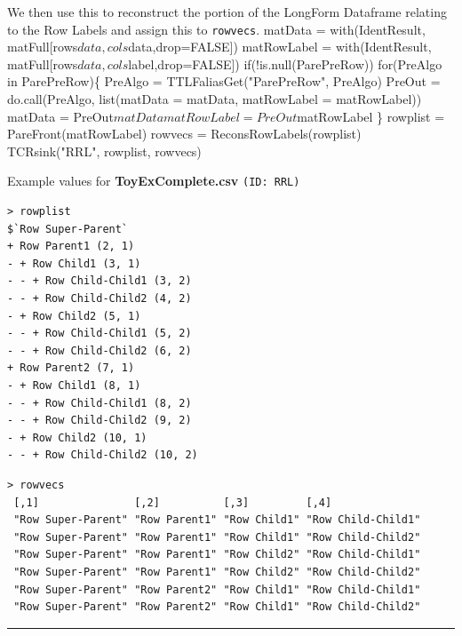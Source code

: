 \documentclass[a4paper]{article}
\begin{document}
We then use this to reconstruct the portion of the LongForm Dataframe
relating to the Row Labels and assign this to \verb|rowvecs|.
\nwenddocs{}\endmoddef
matData = with(IdentResult,
  matFull[rows$data, cols$data,drop=FALSE])
matRowLabel = with(IdentResult,
  matFull[rows$data, cols$label,drop=FALSE])
if(!is.null(ParePreRow))
  for(PreAlgo in ParePreRow)\{
    PreAlgo = TTLFaliasGet("ParePreRow", PreAlgo)
    PreOut = do.call(PreAlgo,
      list(matData = matData, matRowLabel = matRowLabel))
    matData = PreOut$matData
    matRowLabel = PreOut$matRowLabel
  \}
rowplist = PareFront(matRowLabel)
rowvecs = ReconsRowLabels(rowplist)
TCRsink("RRL", rowplist, rowvecs)
\eatline
{}\nwendcode{}\nwdocspar

Example values for \textbf{ToyExComplete.csv} \texttt{(ID: RRL)}
\begin{verbatim}
> rowplist
$`Row Super-Parent`
+ Row Parent1 (2, 1)
- + Row Child1 (3, 1)
- - + Row Child-Child1 (3, 2)
- - + Row Child-Child2 (4, 2)
- + Row Child2 (5, 1)
- - + Row Child-Child1 (5, 2)
- - + Row Child-Child2 (6, 2)
+ Row Parent2 (7, 1)
- + Row Child1 (8, 1)
- - + Row Child-Child1 (8, 2)
- - + Row Child-Child2 (9, 2)
- + Row Child2 (10, 1)
- - + Row Child-Child2 (10, 2)

\end{verbatim}
\begin{verbatim}
> rowvecs
 [,1]               [,2]          [,3]         [,4]              
 "Row Super-Parent" "Row Parent1" "Row Child1" "Row Child-Child1"
 "Row Super-Parent" "Row Parent1" "Row Child1" "Row Child-Child2"
 "Row Super-Parent" "Row Parent1" "Row Child2" "Row Child-Child1"
 "Row Super-Parent" "Row Parent1" "Row Child2" "Row Child-Child2"
 "Row Super-Parent" "Row Parent2" "Row Child1" "Row Child-Child1"
 "Row Super-Parent" "Row Parent2" "Row Child1" "Row Child-Child2"
\end{verbatim}
\vspace{-1.5em}
\noindent\rule{0.25\textwidth}{0.4pt}
\vspace{0.5em}
\end{document}
